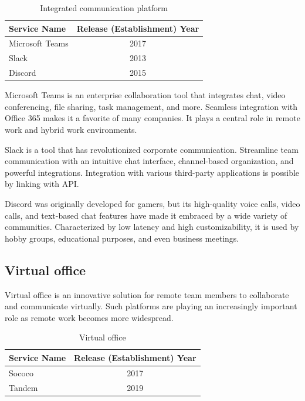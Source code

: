 \documentclass[12pt]{article}
\begin{document}
\begin{table}[h]
    \begin{center}
        \begin{tabular}{|l|c|} \hline
            Service Name    & Release (Establishment) Year \\ \hline
            Microsoft Teams & 2017                         \\
            Slack           & 2013                         \\
            Discord         & 2015                         \\ \hline
        \end{tabular}
        \caption{Integrated communication platform}
    \end{center}
\end{table}

Microsoft Teams is an enterprise collaboration tool that integrates chat, video
conferencing, file sharing, task management, and more. Seamless integration
with Office 365 makes it a favorite of many companies. It plays a central role
in remote work and hybrid work environments.

Slack is a tool that has revolutionized corporate communication. Streamline
team communication with an intuitive chat interface, channel-based
organization, and powerful integrations. Integration with various third-party
applications is possible by linking with API.

Discord was originally developed for gamers, but its high-quality voice calls,
video calls, and text-based chat features have made it embraced by a wide
variety of communities. Characterized by low latency and high customizability,
it is used by hobby groups, educational purposes, and even business meetings.

\subsection{Virtual office}
Virtual office is an innovative solution for remote team members to
collaborate and communicate virtually. Such platforms are playing an
increasingly important role as remote work becomes more widespread.

\begin{table}[h]
    \begin{center}
        \begin{tabular}{|l|c|} \hline
            Service Name & Release (Establishment) Year \\ \hline
            Sococo       & 2017                         \\
            Tandem       & 2019                         \\ \hline
        \end{tabular}
        \caption{Virtual office}
    \end{center}
\end{table}
\end{document}
